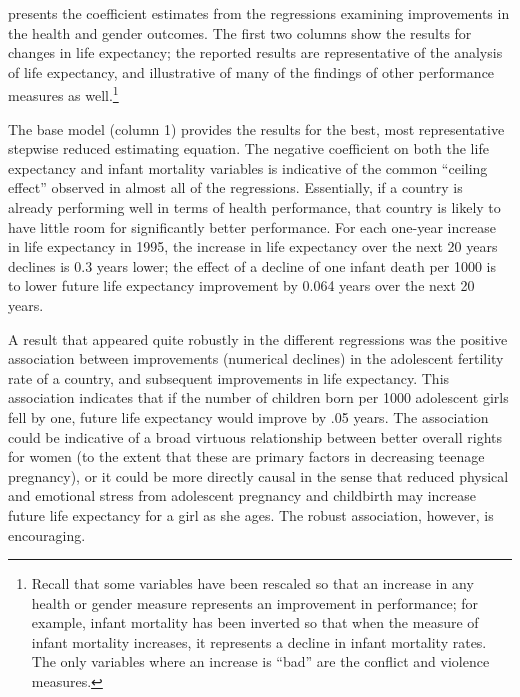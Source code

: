 \documentclass[12pt]{article}
\begin{document}
 presents the coefficient estimates from the regressions examining improvements in the health and gender outcomes. The first two columns show the results for changes in life expectancy; the reported results are representative of the analysis of life expectancy, and illustrative of many of the findings of other performance measures as well.\footnote{Recall that some variables have been rescaled so that an increase in any health or gender measure represents an improvement in performance; for example, infant mortality has been inverted so that when the measure of infant mortality increases, it represents a decline in infant mortality rates. The only variables where an increase is \enquote{bad} are the conflict and violence measures.}

The base model (column 1) provides the results for the best, most representative stepwise reduced estimating equation. The negative coefficient on both the life expectancy and infant mortality variables is indicative of the common \enquote{ceiling effect} observed in almost all of the regressions. Essentially, if a country is already performing well in terms of health performance, that country is likely to have little room for significantly better performance. For each one-year increase in life expectancy in 1995, the increase in life expectancy over the next 20 years declines is 0.3 years lower; the effect of a decline of one infant death per 1000 is to lower future life expectancy improvement by 0.064 years over the next 20 years.

A result that appeared quite robustly in the different regressions was the positive association between improvements (numerical declines) in the adolescent fertility rate of a country, and subsequent improvements in life expectancy. This association indicates that if the number of children born per 1000 adolescent girls fell by one, future life expectancy would improve by .05 years. The association could be indicative of a broad virtuous relationship between better overall rights for women (to the extent that these are primary factors in decreasing teenage pregnancy), or it could be more directly causal in the sense that reduced physical and emotional stress from adolescent pregnancy and childbirth may increase future life expectancy for a girl as she ages. The robust association, however, is encouraging.
\end{document}
